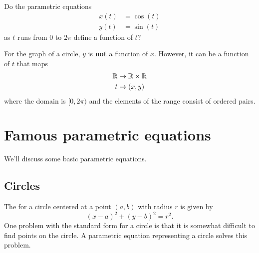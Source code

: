 \documentclass{ximera}
\begin{document}
\begin{question}
  Do the parametric equations
  \begin{align*}
    x(t) &= \cos(t)\\
    y(t) &= \sin(t)
  \end{align*}
  as $t$ runs from $0$ to $2\pi$ define a function of $t$?
  \begin{multipleChoice}
  \end{multipleChoice}
  \begin{feedback}
    For the graph of a circle, $y$ is \textbf{not} a function of
    $x$. However, it can be a function of $t$ that maps
    \begin{align*}
    \mathbb R &\to \mathbb R\times \mathbb R\\
    t &\mapsto (x,y)
    \end{align*}
    where the domain is $[0,2\pi)$ and the elements of the range
      consist of ordered pairs.
  \end{feedback}
\end{question}


\section{Famous parametric equations}

We'll discuss some basic parametric equations.


\subsection{Circles}

The  for a circle
centered at a point $(a,b)$ with radius $r$ is given by
\[
(x-a)^2 + (y-b)^2 = r^2.
\]
One problem with the standard form for a circle is that it is somewhat
difficult to find points on the circle. A parametric equation
representing a circle solves this problem.
\end{document}
